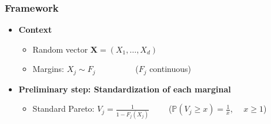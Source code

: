 \documentclass[10pt]{beamer}
\def\mb{\mathbf}
\begin{document}
\begin{frame}
\frametitle{Framework}
\begin{itemize}
\item \textbf{Context} 

  \begin{itemize}
  \item Random vector    $  \mb X = (X_{1},\ldots,X_{d})  $
    \vspace{0.3cm}
  \item Margins: $X_{j}\sim F_j$ ~~~~~~~~~($F_j$ continuous)\\
    \vspace{0.3cm}
  \end{itemize}
    \vspace{0.3cm}

\item \textbf{Preliminary step: Standardization of each marginal}\\
    \vspace{0.3cm}
    \begin{itemize}
    \item   Standard Pareto: 
    $V_{j} = \frac{1}{1- F_j (X_{j})} $  ~~~~\Big($\mathbb{P}(V_j \ge x) = \frac{1}{x}$,~~ $x\ge 1$\Big) \\
    \end{itemize}



\end{itemize}

\end{frame}
\end{document}
